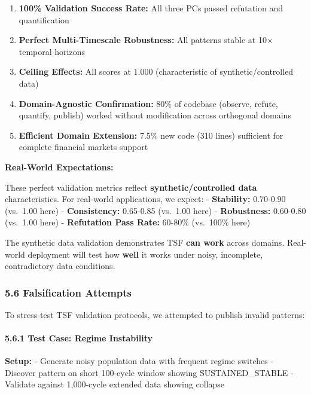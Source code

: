 \documentclass[
]{article}
\providecommand{\tightlist}{%
  \setlength{\itemsep}{0pt}\setlength{\parskip}{0pt}}
\begin{document}
\begin{enumerate}
\def\labelenumi{\arabic{enumi}.}
\tightlist
\item
  \textbf{100\% Validation Success Rate:} All three PCs passed
  refutation and quantification
\item
  \textbf{Perfect Multi-Timescale Robustness:} All patterns stable at
  10× temporal horizons
\item
  \textbf{Ceiling Effects:} All scores at 1.000 (characteristic of
  synthetic/controlled data)
\item
  \textbf{Domain-Agnostic Confirmation:} 80\% of codebase (observe,
  refute, quantify, publish) worked without modification across
  orthogonal domains
\item
  \textbf{Efficient Domain Extension:} 7.5\% new code (310 lines)
  sufficient for complete financial markets support
\end{enumerate}

\textbf{Real-World Expectations:}

These perfect validation metrics reflect \textbf{synthetic/controlled
data} characteristics. For real-world applications, we expect: -
\textbf{Stability:} 0.70-0.90 (vs.~1.00 here) - \textbf{Consistency:}
0.65-0.85 (vs.~1.00 here) - \textbf{Robustness:} 0.60-0.80 (vs.~1.00
here) - \textbf{Refutation Pass Rate:} 60-80\% (vs.~100\% here)

The synthetic data validation demonstrates TSF \textbf{can work} across
domains. Real-world deployment will test how \textbf{well} it works
under noisy, incomplete, contradictory data conditions.

\subsubsection{5.6 Falsification Attempts}\label{falsification-attempts}

To stress-test TSF validation protocols, we attempted to publish invalid
patterns:

\paragraph{5.6.1 Test Case: Regime
Instability}\label{test-case-regime-instability}

\textbf{Setup:} - Generate noisy population data with frequent regime
switches - Discover pattern on short 100-cycle window showing
SUSTAINED\_STABLE - Validate against 1,000-cycle extended data showing
collapse
\end{document}
